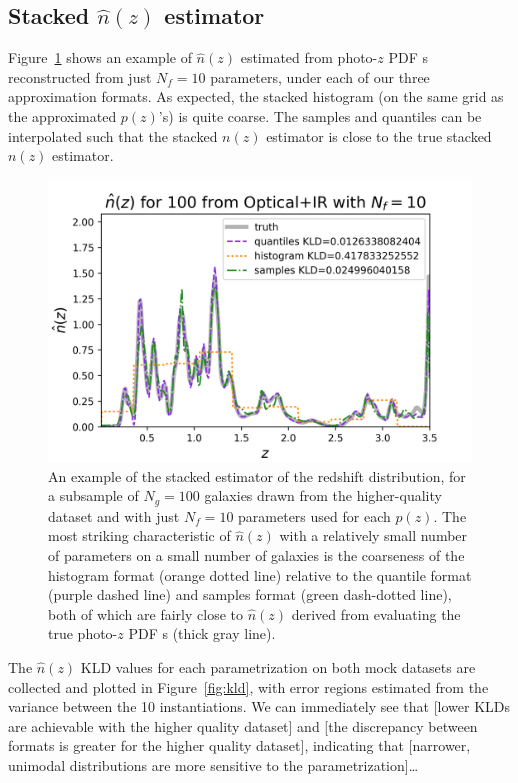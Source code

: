 \documentclass[\docopts]{\docclass}
\newcommand{\pz}{photo-$z$ PDF\xspace}
\begin{document}
\subsection{Stacked $\hat{n}(z)$ estimator}
\label{sec:stacked_results}

Figure~\ref{fig:stacked} shows an example of $\hat{n}(z)$ estimated from \pz s reconstructed
from just $N_{f}=10$ parameters, under each of our three approximation formats. As expected, the stacked histogram (on the same grid as the approximated $p(z)$'s) is quite coarse. The samples and quantiles can be interpolated such that the stacked $n(z)$ estimator is close to the true stacked $n(z)$ estimator.

\begin{figure}
  \includegraphics[width=0.9\columnwidth]{figures/graham_stacked.png}
  \caption{An example of the stacked estimator of the redshift
distribution, for a subsample of $N_{g}=100$ galaxies drawn from the higher-quality dataset and
with just $N_{f}=10$ parameters used for each $p(z)$. The
most striking characteristic of $\hat{n}(z)$ with a relatively small number of
parameters on a small number of galaxies is the coarseness of the histogram
format (orange dotted line) relative to the quantile format (purple dashed
line) and samples format (green dash-dotted line), both of which are fairly
close to $\hat{n}(z)$ derived from evaluating the true \pz s (thick gray line).
  \label{fig:stacked}}
\end{figure}

The $\hat{n}(z)$ KLD values for each parametrization on both mock datasets are
collected and plotted in Figure~\ref{fig:kld}, with error regions estimated from the variance between the 10 instantiations.  We can immediately see that [lower KLDs
are achievable with the higher quality dataset] and [the discrepancy between
formats is greater for the higher quality dataset], indicating that [narrower,
unimodal distributions are more sensitive to the parametrization]\dots
\end{document}
